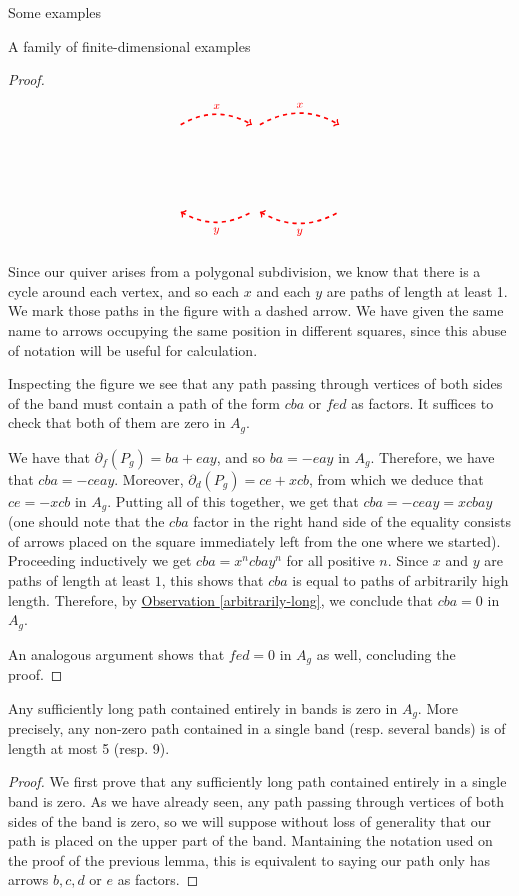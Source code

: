 \begin{chapter}{Some examples}
\begin{section}{A family of finite-dimensional examples}
\begin{proof}
\[\begin{tikzpicture}[text width=1.5mm, font=\footnotesize]
\draw[->, red, dashed, very thick] (-1.9, 2.1) to [bend left] node[above]{$x$} (-0.1, 2.1);
\draw[->, red, dashed, very thick] (0.1, 2.1) to [bend left] node[above]{$x$} (2.1, 2.1);
\draw[<-, red, dashed, very thick] (-1.9, -0.1) to [bend right] node[below]{$y$} (-0.1, -0.1);
\draw[<-, red, dashed, very thick] (0.1, -0.1) to [bend right] node[below]{$y$} (2.1, -0.1);
\end{tikzpicture}
\]

Since our quiver arises from a polygonal subdivision, we know that there is a cycle around each vertex, and so each $x$ and each $y$ are paths of length at least 1. We mark those paths in the figure with a dashed arrow. We have given the same name to arrows occupying the same position in different squares, since this abuse of notation will be useful for calculation.

Inspecting the figure we see that any path passing through vertices of both sides of the band must contain a path of the form $cba$ or $fed$ as factors. It suffices to check that both of them are zero in $A_g$.

We have that $\partial_f(P_g) = ba + eay$, and so $ba  = -eay$ in $A_g$. Therefore, we have that $cba = -ceay$. Moreover, $\partial_d(P_g) = ce + xcb$, from which we deduce that $ce = -xcb$ in $A_g$. Putting all of this together, we get that $cba=-ceay=xcbay$ (one should note that the $cba$ factor in the right hand side of the equality consists of arrows placed on the square immediately left from the one where we started). Proceeding inductively we get $cba=x^ncbay^n$ for all positive $n$. Since $x$ and $y$ are paths of length at least $1$, this shows that $cba$ is equal to paths of arbitrarily high length. Therefore, by \hyperref[arbitrarily-long]{Observation \ref*{arbitrarily-long}}, we conclude that $cba=0$ in $A_g$.

An analogous argument shows that $fed=0$ in $A_g$ as well, concluding the proof. 
\end{proof}

\begin{lemma}\label{long-band-paths} Any sufficiently long path contained entirely in bands is zero in $A_g$. More precisely, any non-zero path contained in a single band (resp. several bands) is of length at most 5 (resp. 9).
\end{lemma}
\begin{proof} We first prove that any sufficiently long path contained entirely in a single band is zero. As we have already seen, any path passing through vertices of both sides of the band is zero, so we will suppose without loss of generality that our path is placed on the upper part of the band. Mantaining the notation used on the proof of the previous lemma, this is equivalent to saying our path only has arrows $b, c, d$ or $e$ as factors.


\end{proof}
\end{section}
\end{chapter}
